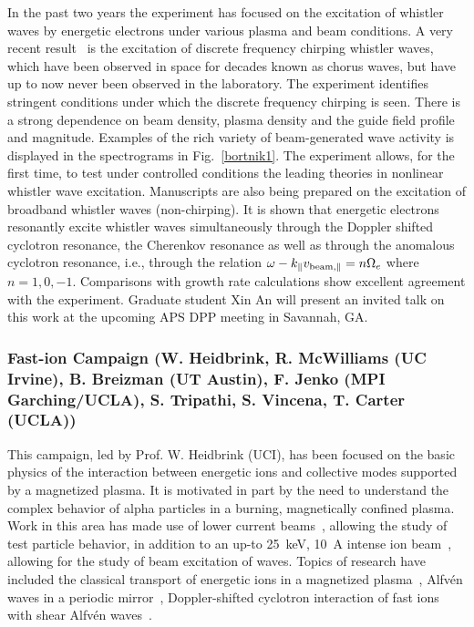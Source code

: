 \documentclass[11pt]{article}
\renewcommand{\cite}{\citep}
\begin{document}
In the past two years the experiment has focused on the excitation of
whistler waves by energetic electrons under various plasma and beam
conditions. A very recent result~\cite{vancompernolle:2015a} is the excitation
of discrete frequency chirping whistler waves, which have been observed
in space for decades known as chorus waves, but have up to now never
been observed in the laboratory. The experiment identifies stringent
conditions under which the discrete frequency chirping is seen. There is
a strong dependence on beam density, plasma density and the guide field
profile and magnitude. Examples of the rich variety of beam-generated
wave activity is displayed in the spectrograms in Fig.~\ref{bortnik1}. The
experiment allows, for the first time, to test under controlled
conditions the leading theories in nonlinear whistler wave excitation.
Manuscripts are also being prepared on the excitation of broadband
whistler waves (non-chirping). It is shown that energetic electrons
resonantly excite whistler waves simultaneously through the Doppler
shifted cyclotron resonance, the Cherenkov resonance as well as through
the anomalous cyclotron resonance, i.e., through the relation $\omega -
k_\parallel v_{{\rm beam}, \parallel} = n\Omega_{e}$ where
$n=1,0,-1$. Comparisons with
growth rate calculations show excellent agreement with the
experiment.  Graduate student Xin An will present an invited talk on
this work at the upcoming APS DPP meeting in Savannah, GA.

\subsubsection{Fast-ion Campaign (W. Heidbrink, R. McWilliams (UC Irvine), B.
Breizman (UT Austin), F. Jenko (MPI Garching/UCLA), S. Tripathi, S.
Vincena, T. Carter (UCLA))}


This campaign, led by Prof. W. Heidbrink (UCI), has been focused on the basic
physics of the interaction between energetic ions and collective modes
supported by a magnetized plasma. It is motivated in part by the need to
understand the complex behavior of alpha particles in a burning,
magnetically confined plasma.  Work in this area has made use of lower
current beams~\cite{zhang:2007}, allowing the study of test particle behavior, in
addition to an up-to 25~keV, 10~A intense ion beam~\cite{tripathi:2011}, allowing for the
study of beam excitation of waves.    Topics of research have included
the classical transport of energetic ions in a magnetized
plasma~\cite{zhao:2005}, Alfv\'en waves in a periodic
mirror~\cite{zhang:2008a}, Doppler-shifted cyclotron interaction of
fast ions with shear Alfv\'{e}n waves~\cite{zhang:2008b,zhang:2009}.
\end{document}
